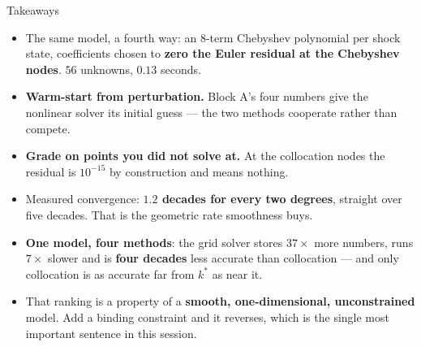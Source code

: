 \begin{frame}{Takeaways}
\begin{takeawaybox}
\begin{itemize}\small
  \item The same model, a fourth way: an $8$-term Chebyshev polynomial per shock state, coefficients chosen to \textbf{zero the Euler residual at the Chebyshev nodes}. $56$ unknowns, $0.13$ seconds.
  \item \textbf{Warm-start from perturbation.} Block A's four numbers give the nonlinear solver its initial guess --- the two methods cooperate rather than compete.
  \item \textbf{Grade on points you did not solve at.} At the collocation nodes the residual is $10^{-15}$ by construction and means nothing.
  \item Measured convergence: \textbf{$1.2$ decades for every two degrees}, straight over five decades. That is the geometric rate smoothness buys.
  \item \textbf{One model, four methods}: the grid solver stores $37\times$ more numbers, runs $7\times$ slower and is \textbf{four decades} less accurate than collocation --- and only collocation is as accurate far from $k^{*}$ as near it.
  \item That ranking is a property of a \textbf{smooth, one-dimensional, unconstrained} model. Add a binding constraint and it reverses, which is the single most important sentence in this session.
\end{itemize}
\end{takeawaybox}
\end{frame}

